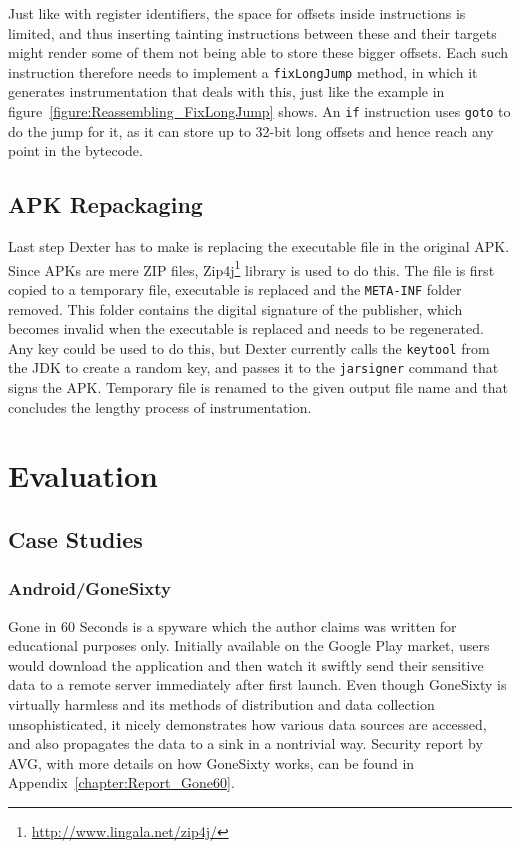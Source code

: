 \documentclass[12pt,twoside,notitlepage]{report}
\newcommand{\weblink}[1] {\footnote{\scriptsize\url{#1}}}
\begin{document}
Just like with register identifiers, the space for offsets inside instructions is limited, and thus inserting tainting instructions between these and their targets might render some of them not being able to store these bigger offsets. Each such instruction therefore needs to implement a \verb$fixLongJump$ method, in which it generates instrumentation that deals with this, just like the example in figure~\ref{figure:Reassembling_FixLongJump} shows. An \verb$if$ instruction uses \verb$goto$ to do the jump for it, as it can store up to 32-bit long offsets and hence reach any point in the bytecode. 

\section{APK Repackaging}

Last step Dexter has to make is replacing the executable file in the original APK. Since APKs are mere ZIP files, Zip4j\weblink{http://www.lingala.net/zip4j/} library is used to do this. The file is first copied to a temporary file, executable is replaced and the \verb$META-INF$ folder removed. This folder contains the digital signature of the publisher, which becomes invalid when the executable is replaced and needs to be regenerated. Any key could be used to do this, but Dexter currently calls the \verb$keytool$ from the JDK to create a random key, and passes it to the \verb$jarsigner$ command that signs the APK. Temporary file is renamed to the given output file name and that concludes the lengthy process of instrumentation.

\cleardoublepage
\chapter{Evaluation}

\section{Case Studies}

\subsection{Android/GoneSixty}

Gone in 60 Seconds is a spyware which the author claims was written for educational purposes only. Initially available on the Google Play market, users would download the application and then watch it swiftly send their sensitive data to a remote server immediately after first launch. Even though GoneSixty is virtually harmless and its methods of distribution and data collection unsophisticated, it nicely demonstrates how various data sources are accessed, and also propagates the data to a sink in a nontrivial way. Security report by AVG, with more details on how GoneSixty works, can be found in Appendix~\ref{chapter:Report_Gone60}.
\end{document}
